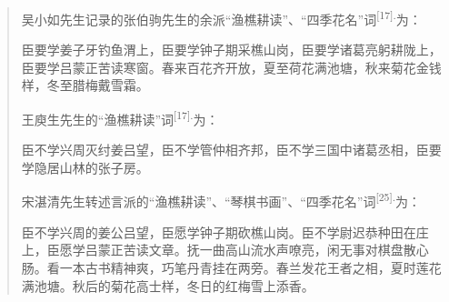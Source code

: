   \begin{quote}
  吴小如先生记录的张伯驹先生的余派``渔樵耕读''、``四季花名''词\textsuperscript{{[}17{]}.}为：

  臣要学姜子牙钓鱼渭上，臣要学钟子期采樵山岗，臣要学诸葛亮躬耕陇上，臣要学吕蒙正苦读寒窗。春来百花齐开放，夏至荷花满池塘，秋来菊花金钱样，冬至腊梅戴雪霜。

  王庾生先生的``渔樵耕读''词\textsuperscript{{[}17{]}.}为：

  臣不学兴周灭纣姜吕望，臣不学管仲相齐邦，臣不学三国中诸葛丞相，臣要学隐居山林的张子房。

  宋湛清先生转述言派的``渔樵耕读''、``琴棋书画''、``四季花名''词\textsuperscript{{[}25{]}.}为：

  臣不学兴周的姜公吕望，臣愿学钟子期砍樵山岗。臣不学尉迟恭种田在庄上，臣愿学吕蒙正苦读文章。抚一曲高山流水声嘹亮，闲无事对棋盘散心肠。看一本古书精神爽，巧笔丹青挂在两旁。春兰发花王者之相，夏时莲花满池塘。秋后的菊花高士样，冬日的红梅雪上添香。
  \end{quote}

